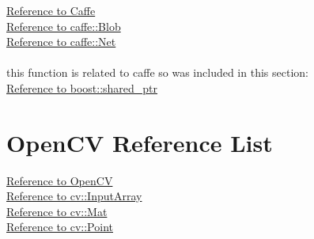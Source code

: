 \documentclass{scrreprt}
\begin{document}
\href{http://caffe.berkeleyvision.org/doxygen/index.html}{Reference to Caffe}
\\
\href{http://caffe.berkeleyvision.org/doxygen/classcaffe_1_1Blob.html}{Reference to caffe::Blob}
\\
\href{http://caffe.berkeleyvision.org/doxygen/classcaffe_1_1Net.html}{Reference to caffe::Net}
\\\\
this function is related to caffe so was included in this section:
\\
\href{http://www.boost.org/doc/libs/1_63_0/libs/smart_ptr/shared_ptr.htm}{Reference to boost::shared\_ptr}


\section{OpenCV Reference List}

\href{http://docs.opencv.org/3.1.0/}{Reference to OpenCV}
\\
\href{http://docs.opencv.org/3.1.0/d4/d32/classcv_1_1__InputArray.html}{Reference to cv::InputArray}
\\
\href{http://docs.opencv.org/3.1.0/d3/d63/classcv_1_1Mat.html#details}{Reference to cv::Mat}
\\
\href{http://docs.opencv.org/3.1.0/db/d4e/classcv_1_1Point__.html}{Reference to cv::Point}
\end{document}
